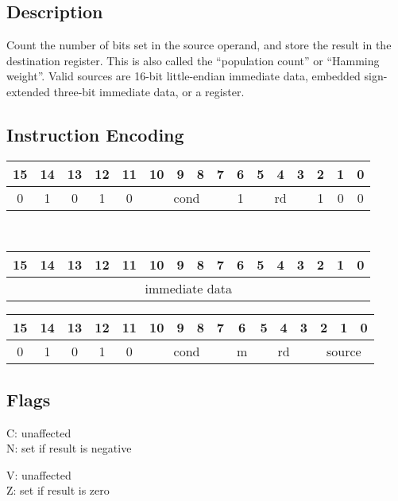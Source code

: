 \documentclass[11pt]{book}
\newcommand*{\encoding}[1]{\noindent
\begin{tabular}{|c|c|c|c|c|c|c|c|c|c|c|c|c|c|c|c|}
\multicolumn{1}{c}{15}&
\multicolumn{1}{c}{14}&
\multicolumn{1}{c}{13}&
\multicolumn{1}{c}{12}&
\multicolumn{1}{c}{11}&
\multicolumn{1}{c}{10}&
\multicolumn{1}{c}{9}&
\multicolumn{1}{c}{8}&
\multicolumn{1}{c}{7}&
\multicolumn{1}{c}{6}&
\multicolumn{1}{c}{5}&
\multicolumn{1}{c}{4}&
\multicolumn{1}{c}{3}&
\multicolumn{1}{c}{2}&
\multicolumn{1}{c}{1}&
\multicolumn{1}{c}{0}\\\hline
#1\\\hline
\end{tabular}}
\begin{document}
\subsection*{Description}
Count the number of bits set in the source operand,
and store the result in the destination register.
This is also called the ``population count'' or ``Hamming weight''.
Valid sources are 16-bit little-endian immediate data,
embedded sign-extended three-bit immediate data,
or a register.

\subsection*{Instruction Encoding}
\encoding{0&1&0&1&0%
&\multicolumn{4}{|c|}{cond}%
&1&\multicolumn{3}{|c|}{rd}&1&0&0}\\\null\qquad
\encoding{\multicolumn{16}{|c|}{immediate data}}

\vspace{2\baselineskip}
\encoding{0&1&0&1&0%
&\multicolumn{4}{|c|}{cond}%
&m&\multicolumn{3}{|c|}{rd}&\multicolumn{3}{|c|}{source}}

\subsection*{Flags}
\begin{multicols}{2}\noindent
  C: unaffected\\
  N: set if result is negative

  \columnbreak\noindent
  V: unaffected\\
  Z: set if result is zero
\end{multicols}
\end{document}
